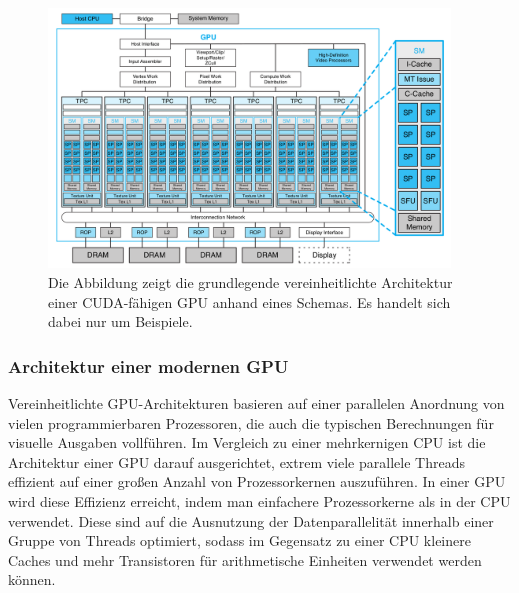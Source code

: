 \documentclass[crop=false]{standalone}
\begin{document}
      \begin{figure}[t]
        \center
        \includegraphics[width=0.95\textwidth]{images/unified_gpu_architecture.png}
        \caption[Grundlegende Architektur einer CUDA-fähigen GPU]{%
          Die Abbildung zeigt die grundlegende vereinheitlichte Architektur einer CUDA-fähigen GPU anhand eines Schemas.
          Es handelt sich dabei nur um Beispiele.
          \cite[S.~9]{Kirk2010}
        }
        \label{fig:gpu-architecture}
      \end{figure}

      \subsubsection{Architektur einer modernen GPU} %
      \label{ssub:architektur_einer_modernen_gpu}
        Vereinheitlichte GPU-Architekturen basieren auf einer parallelen Anordnung von vielen programmierbaren Prozessoren, die auch die typischen Berechnungen für visuelle Ausgaben vollführen.
        Im Vergleich zu einer mehrkernigen CPU ist die Architektur einer GPU darauf ausgerichtet, extrem viele parallele Threads effizient auf einer großen Anzahl von Prozessorkernen auszuführen.
        In einer GPU wird diese Effizienz erreicht, indem man einfachere Prozessorkerne als in der CPU verwendet.
        Diese sind auf die Ausnutzung der Datenparallelität innerhalb einer Gruppe von Threads optimiert, sodass im Gegensatz zu einer CPU kleinere Caches und mehr Transistoren für arithmetische Einheiten verwendet werden können.
        \cite[S.~A11]{Patterson2011}
\end{document}
